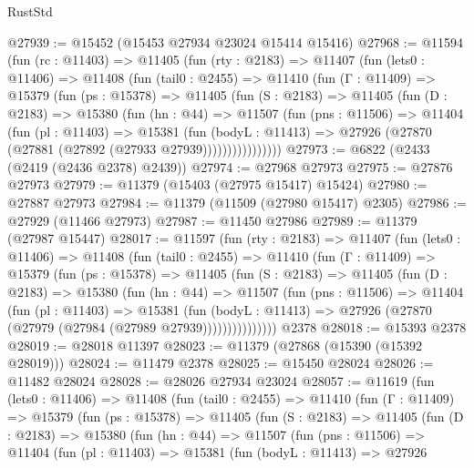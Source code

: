 \begin{lexlean}{RustStd}
\begin{coremodule}
@27939 := @15452 (@15453 @27934 @23024 @15414 @15416)
@27968 := @11594
    (fun (rc : @11403) =>
    @11405
      (fun (rty : @2183) =>
      @11407
        (fun (lets0 : @11406) =>
        @11408
          (fun (tail0 : @2455) =>
          @11410
            (fun (Γ : @11409) =>
            @15379
              (fun (ps : @15378) =>
              @11405
                (fun (S : @2183) =>
                @11405
                  (fun (D : @2183) =>
                  @15380
                    (fun (hn : @44) =>
                    @11507
                      (fun (pns : @11506) =>
                      @11404
                        (fun (pl : @11403) =>
                        @15381
                          (fun (bodyL : @11413) =>
                          @27926 (@27870 (@27881 (@27892 (@27933 @27939))))))))))))))))
@27973 := @6822 (@2433 (@2419 (@2436 @2378) @2439))
@27974 := @27968 @27973
@27975 := @27876 @27973
@27979 := @11379 (@15403 (@27975 @15417) @15424)
@27980 := @27887 @27973
@27984 := @11379 (@11509 (@27980 @15417) @2305)
@27986 := @27929 (@11466 @27973)
@27987 := @11450 @27986
@27989 := @11379 (@27987 @15447)
@28017 := @11597
    (fun (rty : @2183) =>
    @11407
      (fun (lets0 : @11406) =>
      @11408
        (fun (tail0 : @2455) =>
        @11410
          (fun (Γ : @11409) =>
          @15379
            (fun (ps : @15378) =>
            @11405
              (fun (S : @2183) =>
              @11405
                (fun (D : @2183) =>
                @15380
                  (fun (hn : @44) =>
                  @11507
                    (fun (pns : @11506) =>
                    @11404
                      (fun (pl : @11403) =>
                      @15381
                        (fun (bodyL : @11413) =>
                        @27926 (@27870 (@27979 (@27984 (@27989 @27939)))))))))))))))
    @2378
@28018 := @15393 @2378
@28019 := @28018 @11397
@28023 := @11379 (@27868 (@15390 (@15392 @28019)))
@28024 := @11479 @2378
@28025 := @15450 @28024
@28026 := @11482 @28024
@28028 := @28026 @27934 @23024
@28057 := @11619
    (fun (lets0 : @11406) =>
    @11408
      (fun (tail0 : @2455) =>
      @11410
        (fun (Γ : @11409) =>
        @15379
          (fun (ps : @15378) =>
          @11405
            (fun (S : @2183) =>
            @11405
              (fun (D : @2183) =>
              @15380
                (fun (hn : @44) =>
                @11507
                  (fun (pns : @11506) =>
                  @11404
                    (fun (pl : @11403) =>
                    @15381
                      (fun (bodyL : @11413) =>
                      @27926

\end{coremodule}
\end{lexlean}
